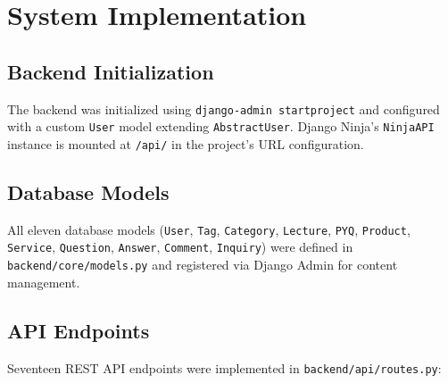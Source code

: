\documentclass[12pt,a4paper]{report}
\begin{document}
\section{System Implementation}

\subsection{Backend Initialization}
The backend was initialized using \texttt{django-admin startproject} and configured with a custom
\texttt{User} model extending \texttt{AbstractUser}. Django Ninja's \texttt{NinjaAPI} instance
is mounted at \texttt{/api/} in the project's URL configuration.

\subsection{Database Models}
All eleven database models (\texttt{User}, \texttt{Tag}, \texttt{Category}, \texttt{Lecture},
\texttt{PYQ}, \texttt{Product}, \texttt{Service}, \texttt{Question}, \texttt{Answer},
\texttt{Comment}, \texttt{Inquiry}) were defined in \texttt{backend/core/models.py} and
registered via Django Admin for content management.

\subsection{API Endpoints}
Seventeen REST API endpoints were implemented in \texttt{backend/api/routes.py}:
\end{document}
